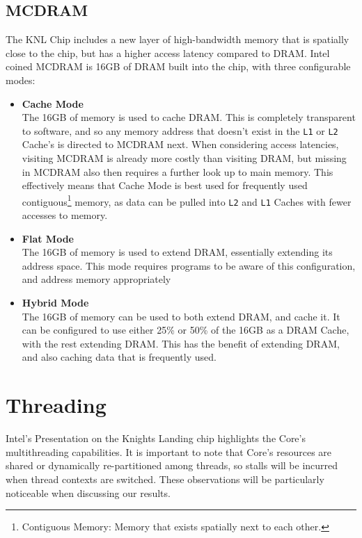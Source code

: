 \documentclass[bsc,frontabs,twoside,singlespacing,parskip,deptreport]{infthesis}     %
\begin{document}
\subsection{MCDRAM}
The KNL Chip includes a new layer of high-bandwidth memory that is spatially close to the chip, but has a higher access latency compared to DRAM. Intel coined MCDRAM is 16GB of DRAM built into the chip, with three configurable modes:

\begin{itemize}
    \item \textbf{Cache Mode} \\
    The 16GB of memory is used to cache DRAM. This is completely transparent to software, and so any memory address that doesn't exist in the \texttt{L1} or \texttt{L2} Cache's is directed to MCDRAM next. When considering access latencies, visiting MCDRAM is already more costly than visiting DRAM, but missing in MCDRAM also then requires a further look up to main memory. This effectively means that Cache Mode is best used for frequently used contiguous\footnote{Contiguous Memory: Memory that exists spatially next to each other.} memory, as data can be pulled into \texttt{L2} and \texttt{L1} Caches with fewer accesses to memory.
    
    \item \textbf{Flat Mode} \\
    The 16GB of memory is used to extend DRAM, essentially extending its address space. This mode requires programs to be aware of this configuration, and address memory appropriately
    
    \item \textbf{Hybrid Mode} \\
    The 16GB of memory can be used to both extend DRAM, and cache it. It can be configured to use either 25\% or 50\% of the 16GB as a DRAM Cache, with the rest extending DRAM. This has the benefit of extending DRAM, and also caching data that is frequently used.
\end{itemize}

\section{Threading}\label{knl-threading}
Intel's Presentation\cite{intel_pres} on the Knights Landing chip highlights the Core's multithreading capabilities. It is important to note that Core's resources are shared or dynamically re-partitioned among threads, so stalls will be incurred when thread contexts are switched. These observations will be particularly noticeable when discussing our results.
\end{document}
